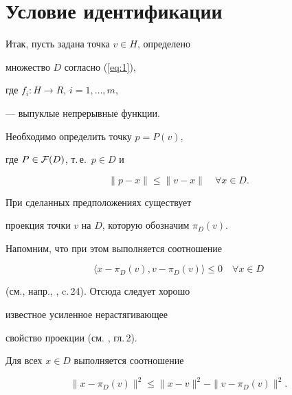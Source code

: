 \section{Условие идентификации}





 Итак, пусть задана точка $ v\in H$, определено


множество $D$ согласно (\ref{eq:1}),


где $ f_{i}:H \rightarrow R$, $i=1,\dotsc,m$,


--- выпуклые непрерывные функции.


 Необходимо определить точку $p=P(v)$,


где $ P \in {\cal F}(D)$, т.\,е.~$p\in D$ и


\begin{equation} \label{eq:2}


 \| p - x \| \leq \| v - x \| \quad \forall x\in D.


\end{equation}


При сделанных предположениях существует


проекция точки $v$ на $D$, которую обозначим $\pi_D(v)$.


Напомним, что при этом выполняется соотношение


\begin{equation} \label{eq:3}


 \langle x-\pi_D(v), v- \pi_D(v) \rangle \leq 0 \quad \forall x \in D


\end{equation}


(см., напр., \cite{Kar86}, c.\,24). Отсюда следует хорошо


известное усиленное нерастягивающее


свойство проекции (см. \cite{VA93}, гл.\,2).





\begin{lem} \label{lm:1}


Для всех $x \in D$ выполняется соотношение


\begin{equation} \label{eq:4}


\|x -\pi_D(v)\|^2


 \leq


 \|x -v\|^2 - \|v- \pi_D(v)\|^2.


\end{equation}


\end{lem}





